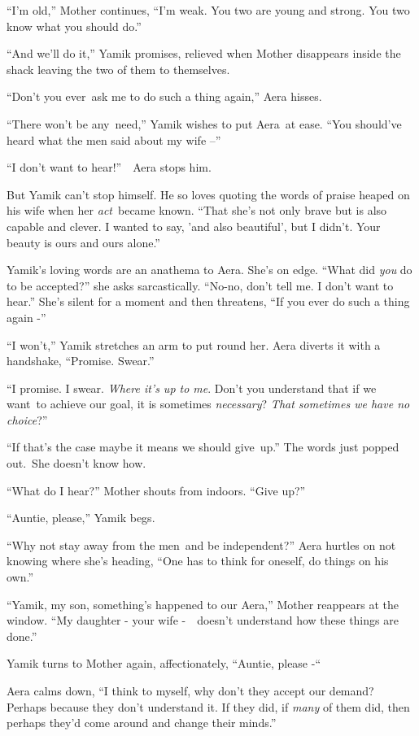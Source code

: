 \documentclass[twoside,11pt]{book}
\begin{document}
``I'm old,'' Mother continues, ``I'm weak. You two are young and strong. You two
know what you should do.''

``And we'll do it,'' Yamik promises, relieved when Mother disappears inside the shack leaving
the two of them to themselves. 

``Don't you ever~ask me to do such a thing again,'' Aera hisses. 

``There won't be any~need,'' Yamik wishes to put Aera\ at ease. ``You should've
heard what the men said about my wife --'' 

``I don't want to hear!''\ \ Aera stops him.\ 

But Yamik can't stop himself. He so loves quoting the words of praise heaped on his wife when her \textit{act}\ became
known. ``That she's not only brave but is also capable and clever. I wanted to say, 'and also beautiful',
but I didn't. Your beauty is ours and ours alone.'' ~

Yamik's loving words are an anathema to Aera. She's on edge. ``What did \textit{you} do to be
accepted?'' she asks sarcastically. ``No-no, don't tell me. I don't want to
hear.'' She's silent for a moment and then threatens, ``If you ever do such a thing again
-''

``I won't,'' Yamik stretches an arm to put round her. Aera diverts it with a handshake,
``Promise. Swear.'' 

``I promise. I swear. \textit{Where it's up to me}. Don't you understand that if we want~to achieve our
goal, it is sometimes \textit{necessary}? \textit{That sometimes we have no choice}?'' 

``If that's the case maybe it means we should give~up.'' The words just popped out.\ She
doesn't know how.

{}``What do I hear?'' Mother shouts from indoors. ``Give up?'' 

{}``Auntie, please,'' Yamik begs.

{}``Why not stay away from the men~and be independent?'' Aera hurtles on not knowing where she's heading,
``One has to think for oneself, do things on his own.''

``Yamik, my son, something's happened to our Aera,'' Mother reappears at the window.
``My daughter - your wife -\ \ doesn't understand how these things are done.'' 

Yamik turns to Mother again, affectionately, ``Auntie, please -``\ 

Aera calms down, ``I think to myself, why don't they accept our demand? Perhaps because they don't
understand it. If they did, if \textit{many} of them did, then perhaps they'd come around and change their
minds.'' 
\end{document}
